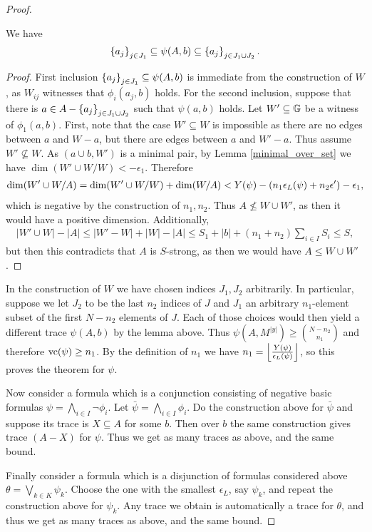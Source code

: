 \begin{proof}
  \begin{Lemma} We have
    \begin{align*}
      \left\{a_j\right\}_{j \in J_1} \subseteq \psi(A, b) \subseteq \left\{a_j\right\}_{j \in J_1 \cup J_2}.
    \end{align*}
  \end{Lemma}
  \begin{proof}
    First inclusion $\left\{a_j\right\}_{j \in J_1} \subseteq \psi(A, b)$ is immediate from the construction of $W$,
    as $W_{ij}$ witnesses that $\phi_i(a_j, b)$ holds.
    For the second inclusion, suppose that there is $a \in A - \left\{a_j\right\}_{j \in J_1 \cup J_2}$ such that $\psi(a,b)$ holds.
    Let $W' \subseteq \mathbb G$ be a witness of $\phi_1(a,b)$.
    First, note that the case $W' \subseteq W$ is impossible
    as there are no edges between $a$ and $W - a$, but there are edges between $a$ and $W' - a$.
    Thus assume $W' \not\subseteq W$.
    As $(a \cup b, W')$ is a minimal pair, by Lemma \ref{minimal_over_set} we have $\dim (W' \cup W / W) < -\epsilon_1$.
    Therefore
    \begin{align*}
      \dim(W' \cup W / A) = \dim (W' \cup W / W) + \dim(W/A) < Y(\psi) - \left(n_1 \epsilon_L(\psi) + n_2 \epsilon'\right) - \epsilon_1,
    \end{align*}
    which is negative by the construction of $n_1, n_2$.
    Thus $A \not\leq W \cup W'$, as then it would have a positive dimension.
    Additionally,
    \begin{align*}
      |W' \cup W| - |A| \leq |W' - W| + |W| - |A| \leq S_1 + |b| + (n_1 + n_2) \sum_{i \in I} S_i \leq S,
    \end{align*}
    but then this contradicts that $A$ is $S$-strong, as then we would have $A \leq W \cup W'$.
  \end{proof}

  In the construction of $W$ we have chosen indices $J_1, J_2$ arbitrarily.
  In particular, suppose we let $J_2$ to be the last $n_2$ indices of $J$ and
  $J_1$ an arbitrary $n_1$-element subset of the first $N - n_2$ elements of $J$.
  Each of those choices would then yield a different trace $\psi(A, b)$ by the lemma above.
  Thus $\psi(A, M^{|y|}) \geq {N - n_2 \choose n_1}$ and therefore $\operatorname{vc}(\psi) \geq n_1$.
  By the definition of $n_1$ we have $n_1 = \left \lfloor \frac{Y(\psi)}{\epsilon_L(\psi)} \right \rfloor$, so this proves the theorem for $\psi$.
 
  Now consider a formula which is a conjunction consisting of negative basic formulas $\psi = \bigwedge_{i \in I} \neg \phi_i$.
  Let $\bar \psi = \bigwedge_{i \in I} \phi_i$.
  Do the construction above for $\bar \psi$ and suppose its trace is $X \subseteq A$ for some $b$.
  Then over $b$ the same construction gives trace $(A - X)$ for $\psi$. Thus we get as many traces as above, and the same bound.
  
  Finally consider a formula which is a disjunction of formulas considered above $\theta = \bigvee_{k \in K} \psi_k$.
  Choose the one with the smallest $\epsilon_L$, say $\psi_k$, and repeat the construction above for $\psi_k$.
  Any trace we obtain is automatically a trace for $\theta$, and thus we get as many traces as above, and the same bound.
\end{proof}

